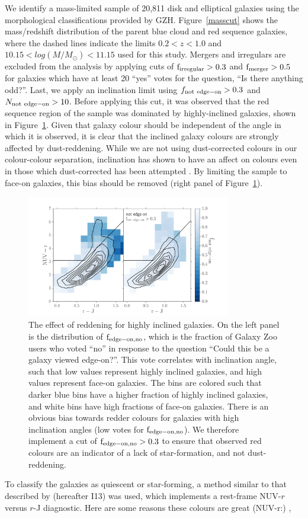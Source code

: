 \documentclass[useAMS,usenatbib]{mn2e}
\begin{document}
We identify a mass-limited sample of 20,811 disk and elliptical galaxies using the morphological classifications provided by GZH. Figure~\ref{masscut} shows the mass/redshift distribution of the parent blue cloud and red sequence galaxies, where the dashed lines indicate the limits $0.2<z<1.0$ and $10.15<log(M/M_{\odot})<11.15$ used for this study. Mergers and irregulars are excluded from the analysis by applying cuts of $\rm f_{irregular} > 0.3$ and $\rm f_{merger} > 0.5$ for galaxies which have at least 20 ``yes'' votes for the question, ``Is there anything odd?''. Last, we apply an inclination limit using $f_{\rm not~edge-on} > 0.3$ and $N_{\rm not~edge-on}>10$. Before applying this cut, it was observed that the red sequence region of the sample was dominated by highly-inclined galaxies, shown in Figure~\ref{fig:edgeon}. Given that galaxy colour should be independent of the angle in which it is observed, it is clear that the inclined galaxy colours are strongly affected by dust-reddening. While we are not using dust-corrected colours in our colour-colour separation, inclination has shown to have an affect on colours even in those which dust-corrected has been attempted \citep{Morselli2016a,Devour2017}. By limiting the sample to face-on galaxies, this bias should be removed (right panel of Figure~\ref{fig:edgeon}). 
 
\begin{figure}
\centering
\includegraphics[width=3.5in,trim={1cm 0cm 1cm 1cm},clip]{figures/edgeon_colorcolor.pdf}
\caption{The effect of reddening for highly inclined galaxies. On the left panel is the distribution of $\rm f_{edge-on,no}$, which is the fraction of Galaxy Zoo users who voted ``no'' in response to the question ``Could this be a galaxy viewed edge-on?''. This vote correlates with inclination angle, such that low values represent highly inclined galaxies, and high values represent face-on galaxies. The bins are colored such that darker blue bins have a higher fraction of highly inclined galaxies, and white bins have high fractions of face-on galaxies. There is an obvious bias towards redder colours for galaxies with high inclination angles (low votes for $\rm f_{edge-on,no}$). We therefore implement a cut of $\rm f_{edge-on,no}>0.3$ to ensure that observed red colours are an indicator of a lack of star-formation, and not dust-reddening. }
\label{fig:edgeon}
\end{figure}
To classify the galaxies as quiescent or star-forming, a method similar to that described by \citet{Ilbert2013} (hereafter I13) was used, which implements a rest-frame NUV-$r$ versus $r$-J diagnostic. Here are some reasons these colours are great (NUV-r:) \citep{Arnouts2007a,Salim2005a,Wyder2007},\citep{Martin2007}
\end{document}
